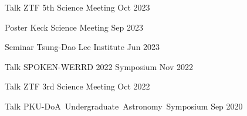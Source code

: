 


\begin{cventries}
	
	\cvsimpentry
	{Talk}
	{ZTF 5th Science Meeting}
	{Oct 2023}
	{}
	
	\cvsimpentry
	{Poster}
	{Keck Science Meeting}
	{Sep 2023}
	{}

	\cvsimpentry
	{Seminar}
	{Tsung-Dao Lee Institute}
	{Jun 2023}
	{}

	\cvsimpentry
	{Talk}
	{SPOKEN-WERRD 2022 Symposium} %
	{Nov 2022} %
	{}

	\cvsimpentry
	{Talk} %
	{ZTF 3rd Science Meeting} %
	{Oct 2022} %
	{}
	
	\cvsimpentry
	{Talk} %
	{PKU-DoA Undergraduate Astronomy Symposium} %
	{Sep 2020} %
	{}

\end{cventries}